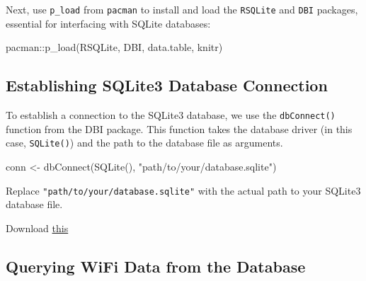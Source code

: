 \documentclass[
  letterpaper,
]{scrbook}
\newenvironment{Shaded}{\begin{snugshade}}{\end{snugshade}}
\newcommand{\FunctionTok}[1]{\textcolor[rgb]{0.28,0.35,0.67}{#1}}
\newcommand{\NormalTok}[1]{\textcolor[rgb]{0.00,0.23,0.31}{#1}}
\newcommand{\OtherTok}[1]{\textcolor[rgb]{0.00,0.23,0.31}{#1}}
\newcommand{\SpecialCharTok}[1]{\textcolor[rgb]{0.37,0.37,0.37}{#1}}
\newcommand{\StringTok}[1]{\textcolor[rgb]{0.13,0.47,0.30}{#1}}
\begin{document}
Next, use \texttt{p\_load} from \texttt{pacman} to install and load the
\texttt{RSQLite} and \texttt{DBI} packages, essential for interfacing
with SQLite databases:

\begin{Shaded}
\begin{Highlighting}[]
\NormalTok{pacman}\SpecialCharTok{::}\FunctionTok{p\_load}\NormalTok{(RSQLite, DBI, data.table, knitr)}
\end{Highlighting}
\end{Shaded}

\hypertarget{establishing-sqlite3-database-connection}{%
\subsection{Establishing SQLite3 Database
Connection}\label{establishing-sqlite3-database-connection}}

To establish a connection to the SQLite3 database, we use the
\texttt{dbConnect()} function from the DBI package. This function takes
the database driver (in this case, \texttt{SQLite()}) and the path to
the database file as arguments.

\begin{Shaded}
\begin{Highlighting}[]
\NormalTok{conn }\OtherTok{\textless{}{-}} \FunctionTok{dbConnect}\NormalTok{(}\FunctionTok{SQLite}\NormalTok{(), }\StringTok{"path/to/your/database.sqlite"}\NormalTok{)}
\end{Highlighting}
\end{Shaded}

Replace \texttt{"path/to/your/database.sqlite"} with the actual path to
your SQLite3 database file.

\begin{tcolorbox}[enhanced jigsaw, left=2mm, coltitle=black, colframe=quarto-callout-note-color-frame, bottomrule=.15mm, colback=white, bottomtitle=1mm, breakable, colbacktitle=quarto-callout-note-color!10!white, titlerule=0mm, toptitle=1mm, arc=.35mm, rightrule=.15mm, opacityback=0, title=\textcolor{quarto-callout-note-color}{\faInfo}\hspace{0.5em}{If you don't have the WiFi DB}, toprule=.15mm, leftrule=.75mm, opacitybacktitle=0.6]

Download \href{material/ch3/sample.sqlite3}{this}

\end{tcolorbox}

\hypertarget{querying-wifi-data-from-the-database}{%
\subsection{Querying WiFi Data from the
Database}\label{querying-wifi-data-from-the-database}}
\end{document}
